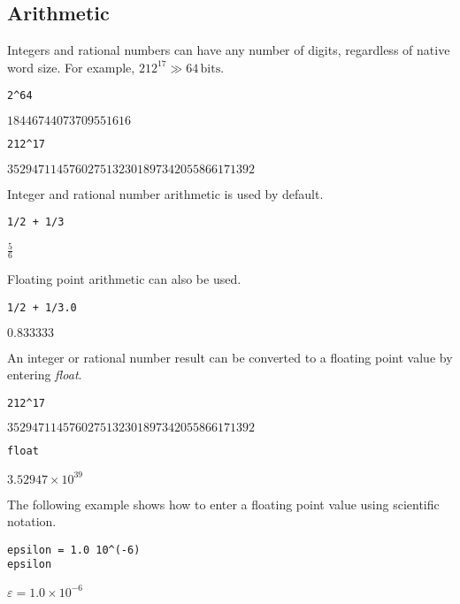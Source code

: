 \subsection{Arithmetic}

\noindent
Integers and rational numbers can have any number of digits,
regardless of native word size.
For example, $212^{17}\gg64\,\text{bits}$.

\begin{Verbatim}[formatcom=\color{blue}]
2^64
\end{Verbatim}

\noindent
$\displaystyle 18446744073709551616$

\begin{Verbatim}[formatcom=\color{blue}]
212^17
\end{Verbatim}

\noindent
$\displaystyle 3529471145760275132301897342055866171392$

\bigskip
\noindent
Integer and rational number arithmetic is used by default.

\begin{Verbatim}[formatcom=\color{blue}]
1/2 + 1/3
\end{Verbatim}

\noindent
$\displaystyle \tfrac{5}{6}$

\bigskip
\noindent
Floating point arithmetic can also be used.

\begin{Verbatim}[formatcom=\color{blue}]
1/2 + 1/3.0
\end{Verbatim}

\noindent
$\displaystyle 0.833333$

\bigskip
\noindent
An integer or rational number result can be converted to a floating
point value by entering {\it float}.

\begin{Verbatim}[formatcom=\color{blue}]
212^17
\end{Verbatim}

\noindent
$\displaystyle 3529471145760275132301897342055866171392$

\begin{Verbatim}[formatcom=\color{blue}]
float
\end{Verbatim}

\noindent
$\displaystyle 3.52947\times10^{39}$

\bigskip
\noindent
The following example shows how to enter a floating point value
using scientific notation.

\begin{Verbatim}[formatcom=\color{blue}]
epsilon = 1.0 10^(-6)
epsilon
\end{Verbatim}

\noindent
$\displaystyle \varepsilon=1.0\times10^{-6}$
